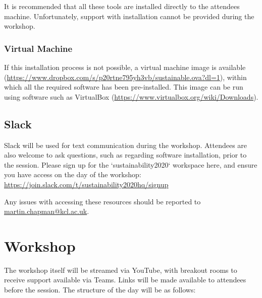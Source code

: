 \documentclass{article}
\begin{document}
It is recommended that all these tools are installed directly to the
attendees machine. Unfortunately, support with installation cannot be
provided during the workshop.

\subsubsection{Virtual Machine}

If this installation process is
not possible, a virtual machine image is available
(\href{https://www.dropbox.com/s/p20rtne795yh3vb/sustainable.ova?dl=1}{https://www.dropbox.com/s/p20rtne795yh3vb/sustainable.ova?dl=1}),
within which all the required software has been pre-installed. This
image can be run using software such as VirtualBox
(\href{https://www.virtualbox.org/wiki/Downloads}{https://www.virtualbox.org/wiki/Downloads}).

\subsection{Slack}

Slack will be used for text communication during the
workshop. Attendees are also welcome to ask questions, such as
regarding software installation, prior to the session. Please
sign up for the `sustainability2020` workspace here, and
ensure you have access on the day of the workshop: \newline
\href{https://join.slack.com/t/sustainability2020hq/signup}{https://join.slack.com/t/sustainability2020hq/signup}

Any issues with accessing these resources should be reported to
\href{mailto:martin.chapman@kcl.ac.uk}{martin.chapman@kcl.ac.uk}.

\section{Workshop}

The workshop itself will be streamed via YouTube, with breakout rooms to receive support available via Teams. Links will be made available to attendees before the session. The structure of the day will be as follows:
\end{document}
